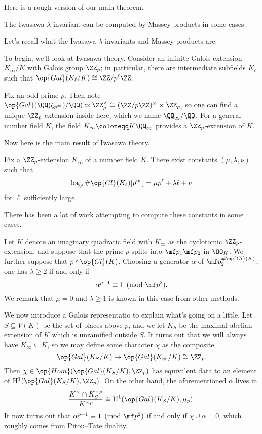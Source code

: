 \documentclass{article}
\begin{document}
Here is a rough version of our main theorem.
\begin{theorem}
	The Iwasawa $\lambda$-invariant can be computed by Massey products in some cases.
\end{theorem}
Let's recall what the Iwasawa $\lambda$-invariants and Massey products are.

To begin, we'll look at Iwasawa theory. Consider an infinite Galois extension $K_\infty/K$ with Galois group $\ZZ_p$; in particular, there are intermediate subfields $K_\ell$ such that $\op{Gal}(K_\ell/K)\cong\ZZ/p^\ell\ZZ$.
\begin{example}
	Fix an odd prime $p$. Then note $\op{Gal}(\QQ(\zeta_{p^\infty})/\QQ)\simeq\ZZ_p^\times\cong(\ZZ/p\ZZ)^\times\times\ZZ_p$, so one can find a unique $\ZZ_p$-extension inside here, which we name $\QQ_\infty/\QQ$. For a general number field $K$, the field $K_\infty\coloneqq K\QQ_\infty$ provides a $\ZZ_p$-extension of $K$.
\end{example}
Now here is the main result of Iwasawa theory.
\begin{theorem}[Iwasawa]
	Fix a $\ZZ_p$-extension $K_\infty$ of a number field $K$. There exist constants $(\mu,\lambda,\nu)$ such that
	\[\log_p\#\op{Cl}(K_\ell)[p^\infty]=\mu p^\ell+\lambda\ell+\nu\]
	for $\ell$ sufficiently large.
\end{theorem}
There has been a lot of work attempting to compute these constants in some cases.
\begin{example}
	Let $K$ denote an imaginary quadratic field with $K_\infty$ as the cyclotomic $\ZZ_p$-extension, and suppose that the prime $p$ splits into $\mf p_1\mf p_2$ in $\OO_K$. We further suppose that $p\nmid\op{Cl}(K)$. Choosing a generator $\alpha$ of $\mf p_2^{\#\op{Cl}(K)}$, one has $\lambda\ge2$ if and only if
	\[\alpha^{p-1}\equiv1\pmod{\mf p^2}.\]
	We remark that $\mu=0$ and $\lambda\ge1$ is known in this case from other methods.
\end{example}
\begin{remark}
	We now introduce a Galois representatio to explain what's going on a little. Let $S\subseteq V(K)$ be the set of places above $p$, and we let $K_S$ be the maximal abelian extension of $K$ which is unramified outside $S$. It turns out that we will always have $K_\infty\subseteq K$, so we may define some character $\chi$ as the composite
	\[\op{Gal}(K_S/K)\to\op{Gal}(K_\infty/K)\cong\ZZ_p.\]
	Then $\chi\in\op{Hom}(\op{Gal}(K_S/K),\ZZ_p)$ has equivalent data to an element of $\mathrm H^1(\op{Gal}(K_S/K),\ZZ_p)$. On the other hand, the aforementioned $\alpha$ lives in
	\[\frac{K^\times\cap K_S^{\times p}}{K^{\times p}}\cong\mathrm H^1(\op{Gal}(K_S/K),\mu_p).\]
	It now turns out that $\alpha^{p-1}\equiv1\pmod{\mf p^2}$ if and only if $\chi\cup\alpha=0$, which roughly comes from Pitou--Tate duality.
\end{remark}
\end{document}
